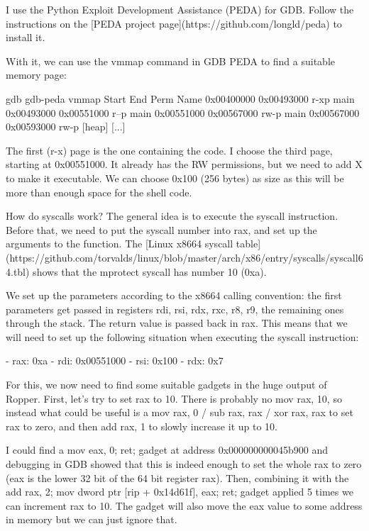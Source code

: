 I use the Python Exploit Development Assistance (PEDA) for GDB. Follow the instructions on the
[PEDA project page](https://github.com/longld/peda) to install it.

With it, we can use the vmmap command in GDB PEDA to find a suitable memory page:

gdb
gdb-peda vmmap
Start              End                Perm	Name
0x00400000         0x00493000         r-xp	main
0x00493000         0x00551000         r--p	main
0x00551000         0x00567000         rw-p	main
0x00567000         0x00593000         rw-p	[heap]
[...]


The first (r-x) page is the one containing the code. I choose the third page, starting at 0x00551000. It already has
the RW permissions, but we need to add X to make it executable. We can choose 0x100 (256 bytes) as size as this will
be more than enough space for the shell code.

How do syscalls work? The general idea is to execute the syscall instruction. Before that, we need to put the syscall
number into rax, and set up the arguments to the function. The [Linux x8664 syscall table](https://github.com/torvalds/linux/blob/master/arch/x86/entry/syscalls/syscall64.tbl)
shows that the mprotect syscall has number 10 (0xa).

We set up the parameters according to the x8664 calling convention: the first parameters get passed in registers rdi,
rsi, rdx, rxc, r8, r9, the remaining ones through the stack. The return value is passed back in rax. This means
that we will need to set up the following situation when executing the syscall instruction:

 - rax: 0xa
 - rdi: 0x00551000
 - rsi: 0x100
 - rdx: 0x7

For this, we now need to find some suitable gadgets in the huge output of Ropper. First, let's try to set rax to 10.
There is probably no mov rax, 10, so instead what could be useful is a mov rax, 0 / sub rax, rax / xor rax, rax
to set rax to zero, and then add rax, 1 to slowly increase it up to 10.

I could find a mov eax, 0; ret; gadget at address 0x000000000045b900 and debugging in GDB showed that this is indeed
enough to set the whole rax to zero (eax is the lower 32 bit of the 64 bit register rax). Then, combining it with the
add rax, 2; mov dword ptr [rip + 0x14d61f], eax; ret; gadget applied 5 times we can increment rax to 10. The gadget
will also move the eax value to some address in memory but we can just ignore that.

